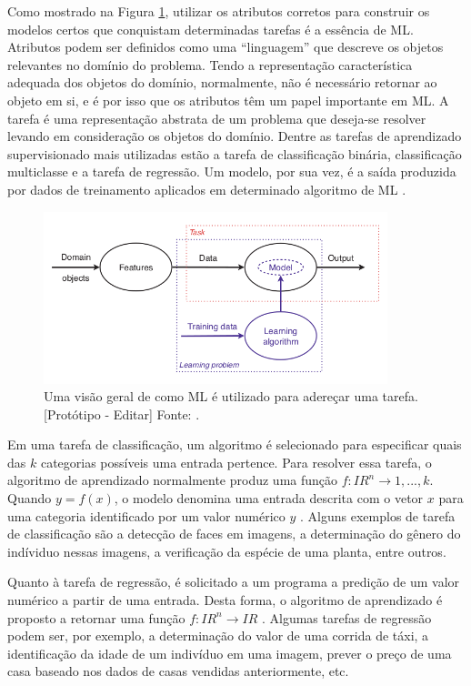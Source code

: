 Como mostrado na Figura \ref{fig:tasks}, utilizar os atributos corretos para construir os modelos certos que conquistam determinadas tarefas é a essência de ML. Atributos podem ser definidos como uma ``linguagem'' que descreve os objetos relevantes no domínio do problema. Tendo a representação característica adequada dos objetos do domínio, normalmente, não é necessário retornar ao objeto em si, e é por isso que os atributos têm um papel importante em ML. A tarefa é uma representação abstrata de um problema que deseja-se resolver levando em consideração os objetos do domínio. Dentre as tarefas de aprendizado supervisionado mais utilizadas estão a tarefa de classificação binária, classificação multiclasse e a tarefa de regressão. Um modelo, por sua vez, é a saída produzida por dados de treinamento aplicados em determinado algoritmo de ML \cite{flach}.

\begin{figure}
\centering
\includegraphics[height=5cm]{imgs/tasks}
\caption{Uma visão geral de como ML é utilizado para adereçar uma tarefa. [Protótipo - Editar] Fonte: \cite{flach}.}
\label{fig:tasks}
\end{figure}


Em uma tarefa de classificação, um algoritmo é selecionado para especificar quais das $k$ categorias possíveis uma entrada pertence. Para resolver essa tarefa, o algoritmo de aprendizado normalmente produz uma função $f : I\!R^n \rightarrow {1,...,k}$. Quando $y = f(x)$, o modelo denomina uma entrada descrita com o vetor $x$ para uma categoria identificado por um valor numérico $y$ \cite{goodfellow}. Alguns exemplos de tarefa de classificação são a detecção de faces em imagens, a determinação do gênero do indíviduo nessas imagens, a verificação da espécie de uma planta, entre outros.

Quanto à tarefa de regressão, é solicitado a um programa a predição de um valor numérico a partir de uma entrada. Desta forma, o algoritmo de aprendizado é proposto a retornar uma função $f : I\!R^n \rightarrow I\!R$ \cite{goodfellow}. Algumas tarefas de regressão podem ser, por exemplo, a determinação do valor de uma corrida de táxi, a identificação da idade de um indivíduo em uma imagem, prever o preço de uma casa baseado nos dados de casas vendidas anteriormente, etc.

